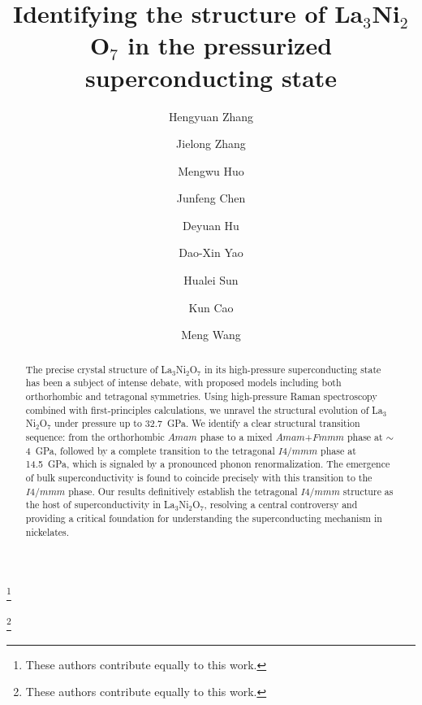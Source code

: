 \documentclass[prx,aps,twocolumn,preprintnumbers,amsmath,amssymb,superscriptaddress,showpacs]{revtex4-2}
\begin{document}
\title {Identifying the structure of La$_3$Ni$_2$O$_7$ in the pressurized superconducting state}
\author{Hengyuan Zhang}
\thanks{These authors contribute equally to this work.} 
\author{Jielong Zhang}
\thanks{These authors contribute equally to this work.} 
\author{Mengwu Huo}
\author{Junfeng Chen}
\author{Deyuan Hu}
\author{Dao-Xin Yao}
\author{Hualei Sun}
\author{Kun Cao}
\author{Meng Wang}

\begin{abstract}
The precise crystal structure of La$_3$Ni$_2$O$_7$ in its high-pressure superconducting state has been a subject of intense debate, with proposed models including both orthorhombic and tetragonal symmetries. Using high-pressure Raman spectroscopy combined with first-principles calculations, we unravel the structural evolution of La$_3$Ni$_2$O$_7$ under pressure up to 32.7~GPa. We identify a clear structural transition sequence: from the orthorhombic $Amam$ phase to a mixed $Amam$+$Fmmm$ phase at $\sim$4~GPa, followed by a complete transition to the tetragonal $I4/mmm$ phase at 14.5~GPa, which is signaled by a pronounced phonon renormalization. The emergence of bulk superconductivity is found to coincide precisely with this transition to the $I4/mmm$ phase. Our results definitively establish the tetragonal $I4/mmm$ structure as the host of superconductivity in La$_3$Ni$_2$O$_7$, resolving a central controversy and providing a critical foundation for understanding the superconducting mechanism in nickelates.
\end{abstract}

\maketitle
\end{document}
